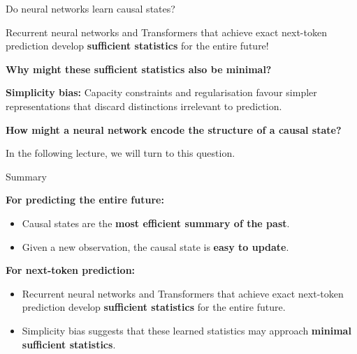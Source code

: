 \documentclass[aspectratio=169,12pt,t]{beamer}
\begin{document}
\begin{frame}{Do neural networks learn causal states?}
  \setlength{\parskip}{0pt}
  \vfill

  Recurrent neural networks and Transformers that achieve exact next-token
  prediction develop \textbf{sufficient statistics} for the entire future!

  \vspace{10mm}
  \textbf{Why might these sufficient statistics also be minimal?}

  \vspace{3mm}
  \textbf{Simplicity bias:} Capacity constraints and regularisation favour
  simpler representations that discard distinctions irrelevant to prediction.

  \vspace{9mm}
  \textbf{How might a neural network encode the structure of a causal state?}

  \vspace{3mm}
  In the following lecture, we will turn to this question.

  \vfill

\end{frame}

\begin{frame}{Summary}
  \setlength{\parskip}{0pt}
  \vfill

  \textbf{For predicting the entire future:}

  \vspace{2mm}
  \begin{itemize}
    \item Causal states are the \textbf{most efficient summary of the past}.
    \item Given a new observation, the causal state is \textbf{easy to update}.
  \end{itemize}

  \vspace{7mm}
  \textbf{For next-token prediction:}

  \vspace{2mm}
  \begin{itemize}
    \item Recurrent neural networks and Transformers that achieve exact
      next-token prediction develop \textbf{sufficient statistics} for the
      entire future.
    \item Simplicity bias suggests that these learned statistics may approach
      \textbf{minimal sufficient statistics}.
  \end{itemize}

  \vfill
\end{frame}
\end{document}
